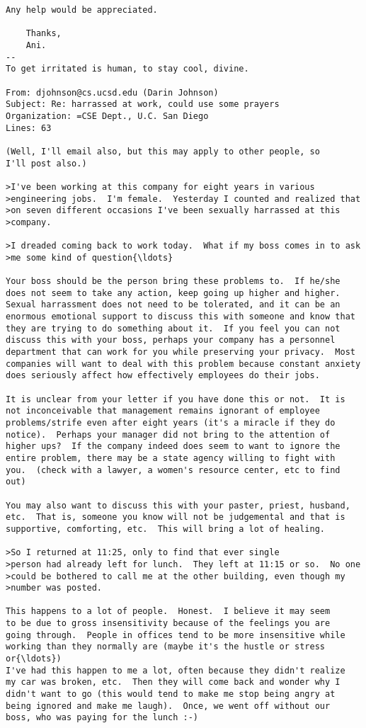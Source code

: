 \documentclass[11pt]{article}
\begin{document}
\begin{Verbatim}[commandchars=\\\{\}]
	Any help would be appreciated.

	Thanks, 
	Ani.
-- 
To get irritated is human, to stay cool, divine.

From: djohnson@cs.ucsd.edu (Darin Johnson)
Subject: Re: harrassed at work, could use some prayers
Organization: =CSE Dept., U.C. San Diego
Lines: 63

(Well, I'll email also, but this may apply to other people, so
I'll post also.)

>I've been working at this company for eight years in various
>engineering jobs.  I'm female.  Yesterday I counted and realized that
>on seven different occasions I've been sexually harrassed at this
>company.

>I dreaded coming back to work today.  What if my boss comes in to ask
>me some kind of question{\ldots}

Your boss should be the person bring these problems to.  If he/she
does not seem to take any action, keep going up higher and higher.
Sexual harrassment does not need to be tolerated, and it can be an
enormous emotional support to discuss this with someone and know that
they are trying to do something about it.  If you feel you can not
discuss this with your boss, perhaps your company has a personnel
department that can work for you while preserving your privacy.  Most
companies will want to deal with this problem because constant anxiety
does seriously affect how effectively employees do their jobs.

It is unclear from your letter if you have done this or not.  It is
not inconceivable that management remains ignorant of employee
problems/strife even after eight years (it's a miracle if they do
notice).  Perhaps your manager did not bring to the attention of
higher ups?  If the company indeed does seem to want to ignore the
entire problem, there may be a state agency willing to fight with
you.  (check with a lawyer, a women's resource center, etc to find out)

You may also want to discuss this with your paster, priest, husband,
etc.  That is, someone you know will not be judgemental and that is
supportive, comforting, etc.  This will bring a lot of healing.

>So I returned at 11:25, only to find that ever single
>person had already left for lunch.  They left at 11:15 or so.  No one
>could be bothered to call me at the other building, even though my
>number was posted.

This happens to a lot of people.  Honest.  I believe it may seem
to be due to gross insensitivity because of the feelings you are
going through.  People in offices tend to be more insensitive while
working than they normally are (maybe it's the hustle or stress or{\ldots})
I've had this happen to me a lot, often because they didn't realize
my car was broken, etc.  Then they will come back and wonder why I
didn't want to go (this would tend to make me stop being angry at
being ignored and make me laugh).  Once, we went off without our
boss, who was paying for the lunch :-)


\end{Verbatim}
\end{document}
